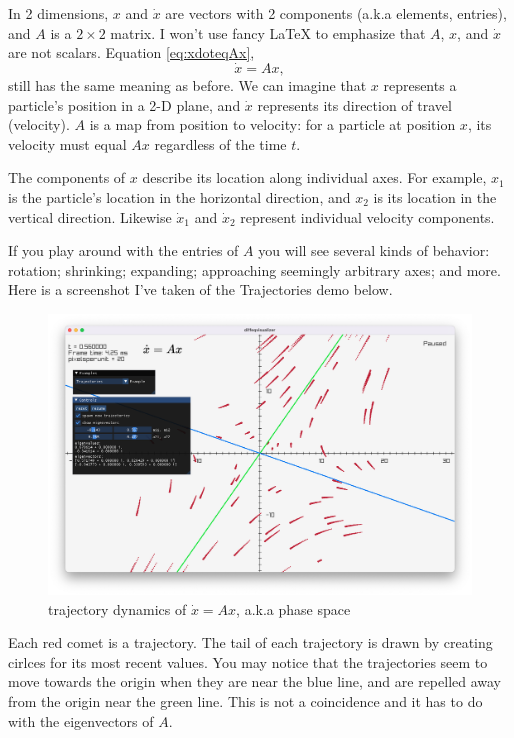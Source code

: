 \documentclass[11pt, oneside]{article}   	%
\begin{document}
In 2 dimensions, $x$ and $\dot{x}$ are vectors with 2 components (a.k.a elements, entries), and $A$ is a $2\times 2$ matrix.
I won't use fancy LaTeX to emphasize that $A$, $x$, and $\dot{x}$ are not scalars.
Equation \ref{eq:xdoteqAx},
$$ \dot{x} = Ax ,$$
still has the same meaning as before.
We can imagine that $x$ represents a particle's position in a 2-D plane,
and $\dot{x}$ represents its direction of travel (velocity).
$A$ is a map from position to velocity: for a particle at position $x$, its velocity must equal $Ax$ regardless of the time $t$.

The components of $x$ describe its location along individual axes.
For example, $x_1$ is the particle's location in the horizontal direction,
and $x_2$ is its location in the vertical direction.
Likewise $\dot{x}_1$ and $\dot{x}_2$ represent individual velocity components.

If you play around with the entries of $A$ you will see several kinds of behavior:
rotation;
shrinking;
expanding;
approaching seemingly arbitrary axes;
and more.
Here is a screenshot I've taken of the Trajectories demo below.

\begin{figure}[h]
\centering
\includegraphics[scale=0.31]{screenshot_trajectories}
\caption{trajectory dynamics of $\dot{x} = Ax$, a.k.a phase space}
\label{fig:Trajectories}
\end{figure}

Each red comet is a trajectory.
The tail of each trajectory is drawn by creating cirlces for its most recent values.
You may notice that the trajectories seem to move towards the origin when they are near the blue line,
and are repelled away from the origin near the green line.
This is not a coincidence and it has to do with the eigenvectors of $A$.
\end{document}
